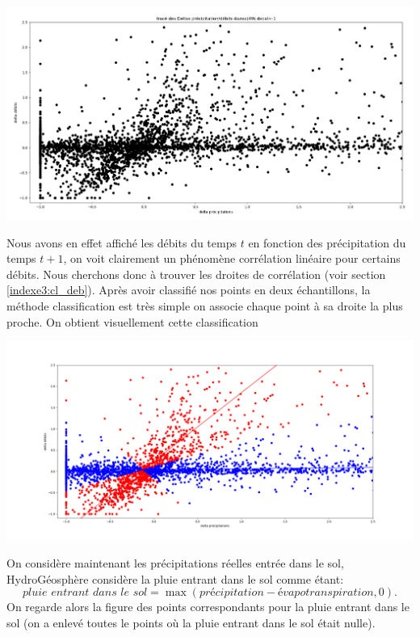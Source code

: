 \documentclass[a4paper,11pt]{article}
\begin{document}
\begin{center}
	\captionsetup{type=figure}
	\includegraphics[scale=0.25]{deb_prec_dec1.png}
\end{center}

Nous avons en effet affiché les débits du temps $t$ en fonction des précipitation du temps $t+1$, on voit clairement un phénomène corrélation linéaire pour certains débits. Nous cherchons donc à trouver les droites de corrélation (voir section \ref{indexe3:cl_deb}). Après avoir classifié nos points en deux échantillons, la méthode classification est très simple on associe chaque point à sa droite la plus proche. On obtient visuellement cette classification

\begin{center}
	\captionsetup{type=figure}
	\includegraphics[scale=0.33]{classification_deb_pr.png}
\end{center}

On considère maintenant les précipitations réelles entrée dans le sol, HydroGéosphère considère la pluie entrant dans le sol comme étant: 
\[\textit{pluie entrant dans le sol}=\max(\textit{précipitation}-\textit{évapotranspiration},0).\]
On regarde alors la figure des points correspondants pour la pluie entrant dans le sol (on a enlevé toutes le points où la pluie entrant dans le sol était nulle).
\end{document}
